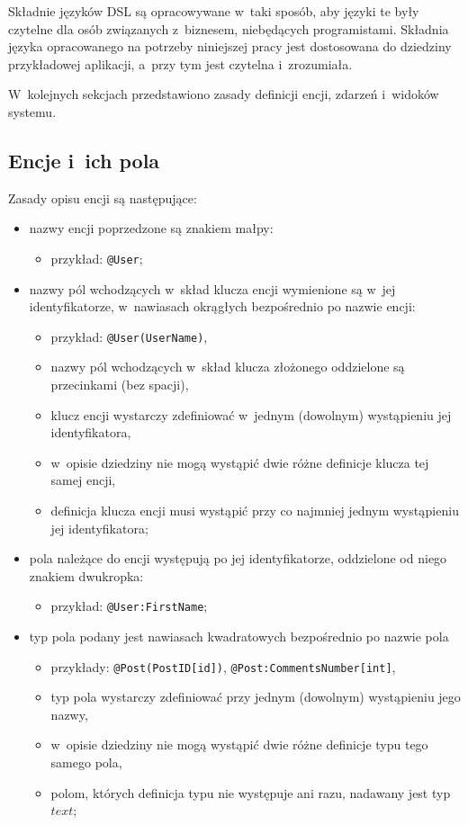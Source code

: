 Składnie języków DSL są opracowywane w~taki sposób, aby języki te były czytelne dla osób związanych z~biznesem, niebędących programistami.
Składnia języka opracowanego na potrzeby niniejszej pracy jest dostosowana do dziedziny przykładowej aplikacji, a~przy tym jest czytelna i~zrozumiała.

W~kolejnych sekcjach przedstawiono zasady definicji encji, zdarzeń i~widoków systemu.


\subsection{Encje i~ich pola}

Zasady opisu encji są następujące:

\begin{itemize}
 \item nazwy encji poprzedzone są znakiem małpy:
  \begin{itemize}
   \item przykład: \verb|@User|;
  \end{itemize}
  
 \item nazwy pól wchodzących w~skład klucza encji wymienione są w~jej identyfikatorze, w~nawiasach okrągłych bezpośrednio po nazwie encji:
  \begin{itemize}
   \item przykład: \verb|@User(UserName)|,
   \item nazwy pól wchodzących w~skład klucza złożonego oddzielone są przecinkami (bez spacji),
   \item klucz encji wystarczy zdefiniować w~jednym (dowolnym) wystąpieniu jej identyfikatora,
   \item w~opisie dziedziny nie mogą wystąpić dwie różne definicje klucza tej samej encji,
   \item definicja klucza encji musi wystąpić przy co najmniej jednym wystąpieniu jej identyfikatora;
  \end{itemize}
 
 \item pola należące do encji występują po jej identyfikatorze, oddzielone od niego znakiem dwukropka:
  \begin{itemize}
   \item przykład: \verb|@User:FirstName|;
  \end{itemize}
  
 \item typ pola podany jest nawiasach kwadratowych bezpośrednio po nazwie pola
  \begin{itemize}
   \item przykłady: \verb|@Post(PostID[id])|, \verb|@Post:CommentsNumber[int]|,
   \item typ pola wystarczy zdefiniować przy jednym (dowolnym) wystąpieniu jego nazwy,
   \item w~opisie dziedziny nie mogą wystąpić dwie różne definicje typu tego samego pola,
   \item polom, których definicja typu nie występuje ani razu, nadawany jest typ $text$;
  \end{itemize}
 

\end{itemize}
